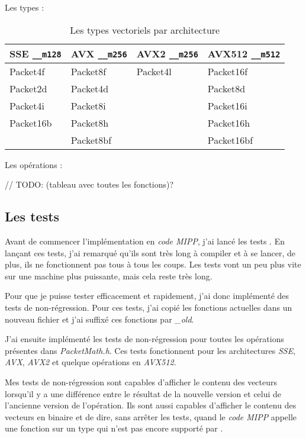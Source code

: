 Les types :

\begin{table}[H]
  \label{eigenTypesTable}
  \centering
  \begin{tabular}[H]{|l|l|l|l|}
    \hline
    \textbf{SSE} \verb|__m128| & \textbf{AVX} \verb|__m256| & \textbf{AVX2} \verb|__m256| & \textbf{AVX512} \verb|__m512|\\
    \hline
    Packet4f     & Packet8f     & Packet4l      & Packet16f       \\
    \hline
    Packet2d     & Packet4d     &               & Packet8d        \\
    \hline
    Packet4i     & Packet8i     &               & Packet16i       \\
    \hline
    Packet16b    & Packet8h     &               & Packet16h       \\
    \hline
                 & Packet8bf    &               & Packet16bf      \\
    \hline
  \end{tabular}
  \caption{Les types vectoriels \Eigen par architecture}
\end{table}

Les opérations :

// TODO: (tableau avec toutes les fonctions)?

\subsection{Les tests}

Avant de commencer l'implémentation en \emph{code MIPP}, j'ai lancé les tests \Eigen.
En lançant ces tests, j'ai remarqué qu'ils sont très long à compiler et à se lancer, de
plus, ils ne fonctionnent pas tous à tous les coups. Les tests vont un peu plus vite sur
une machine plus puissante, mais cela reste très long.

Pour que je puisse tester efficacement et rapidement, j'ai donc implémenté des tests de non-régression.
Pour ces tests, j'ai copié les fonctions actuelles dans un nouveau fichier et
j'ai suffixé ces fonctions par \emph{_old}.

J'ai ensuite implémenté les tests de non-régression pour toutes les opérations présentes
dans \emph{PacketMath.h}. Ces tests fonctionnent pour les architectures \emph{SSE}, \emph{AVX},
\emph{AVX2} et quelque opérations en \emph{AVX512}.

Mes tests de non-régression sont capables d'afficher le contenu des vecteurs lorsqu'il y a
une différence entre le résultat de la nouvelle version et celui de l'ancienne version
de l'opération.
Ils sont aussi capables d'afficher le contenu des vecteurs en binaire et de dire, sans
arrêter les tests, quand le \emph{code MIPP} appelle une fonction \MIPP sur un type qui
n'est pas encore supporté par \MIPP.

